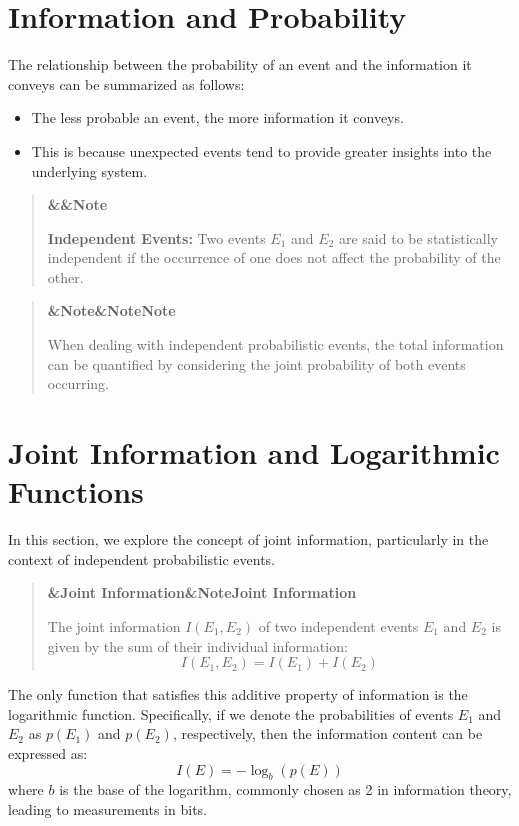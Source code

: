\documentclass[a4paper]{article}
\newcommand{\boxheading}[1]{%
  \par\smallskip
  \noindent\textbf{\ifx&#1&Note\else#1\fi}\par
  \smallskip
}
\newenvironment{thmbox}[1][]{%
  \begin{quote}\color{blue!60!black}\boxheading{#1}\normalcolor
}{\end{quote}}
\newenvironment{defbox}[1][]{%
  \begin{quote}\color{green!40!black}\boxheading{#1}\normalcolor
}{\end{quote}}
\newenvironment{rembox}[1][]{%
  \begin{quote}\color{black!70}\boxheading{#1}\normalcolor
}{\end{quote}}
\begin{document}
\section{Information and Probability}
The relationship between the probability of an event and the information it conveys can be summarized as follows:

\begin{itemize}
    \item The less probable an event, the more information it conveys.
    \item This is because unexpected events tend to provide greater insights into the underlying system.
\end{itemize}

\begin{defbox}
\textbf{Independent Events:} Two events \(E_1\) and \(E_2\) are said to be statistically independent if the occurrence of one does not affect the probability of the other.
\end{defbox}

\begin{rembox}[Note]
When dealing with independent probabilistic events, the total information can be quantified by considering the joint probability of both events occurring.
\end{rembox}

\section{Joint Information and Logarithmic Functions}
In this section, we explore the concept of joint information, particularly in the context of independent probabilistic events.

\begin{thmbox}[Joint Information]
The joint information \(I(E_1, E_2)\) of two independent events \(E_1\) and \(E_2\) is given by the sum of their individual information:
\begin{equation}
I(E_1, E_2) = I(E_1) + I(E_2)
\end{equation}
\end{thmbox}

The only function that satisfies this additive property of information is the logarithmic function. Specifically, if we denote the probabilities of events \(E_1\) and \(E_2\) as \(p(E_1)\) and \(p(E_2)\), respectively, then the information content can be expressed as:
\begin{equation}
I(E) = -\log_b(p(E))
\end{equation}
where \(b\) is the base of the logarithm, commonly chosen as 2 in information theory, leading to measurements in bits.
\end{document}
